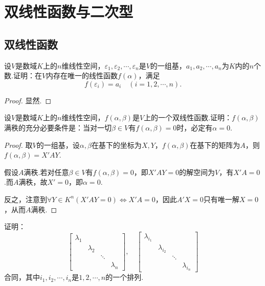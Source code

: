 \section{双线性函数与二次型}
\subsection{双线性函数}
\begin{prob}[1]
	设$V$是数域$K$上的$n$维线性空间，$\varepsilon_1,\varepsilon_2,\cdots,\varepsilon_n$是$V$的一组基，$a_1,a_2,\cdots,a_n$为$K$内的$n$个数.证明：在$V$内存在唯一的线性函数$f(\alpha)$，满足
	\[
		f(\varepsilon_i)=a_i\quad(i=1,2,\cdots,n).
	\]
\end{prob}
\begin{proof}
	显然.
\end{proof}
\begin{prob}[9]
	设$V$是数域$K$上的$n$维线性空间，$f(\alpha,\beta)$是$V$上的一个双线性函数.证明：$f(\alpha,\beta)$满秩的充分必要条件是：当对一切$\beta\in V$有$f(\alpha,\beta)=0$时，必定有$\alpha=0$.
\end{prob}
\begin{proof}
	取$V$的一组基，设$\alpha,\beta$在基下的坐标为$X,Y$，$f(\alpha,\beta)$在基下的矩阵为$A$，则$f(\alpha,\beta)=X'AY$.

	假设$A$满秩.若对任意$\beta\in V$有$f(\alpha,\beta)=0$，即$X'AY=0$的解空间为$V$，有$X'A=0$.而$A$满秩，故$X'=0$，即$\alpha=0$.

	反之，注意到$\forall Y\in K^n(X'AY=0)\iff X'A=0$，因此$A'X=0$只有唯一解$X=0$，从而$A$满秩.
\end{proof}
\begin{prob}[13]
	证明：
	\[
		\begin{bmatrix}
			\lambda_1 &           &        &           \\
			          & \lambda_2 &        &           \\
			          &           & \ddots &           \\
			          &           &        & \lambda_n
		\end{bmatrix},\quad\begin{bmatrix}
			\lambda_{i_1} &               &        &               \\
			              & \lambda_{i_2} &        &               \\
			              &               & \ddots &               \\
			              &               &        & \lambda_{i_n}
		\end{bmatrix}
	\]
	合同，其中$i_1,i_2,\cdots,i_n$是$1,2,\cdots,n$的一个排列.
\end{prob}
